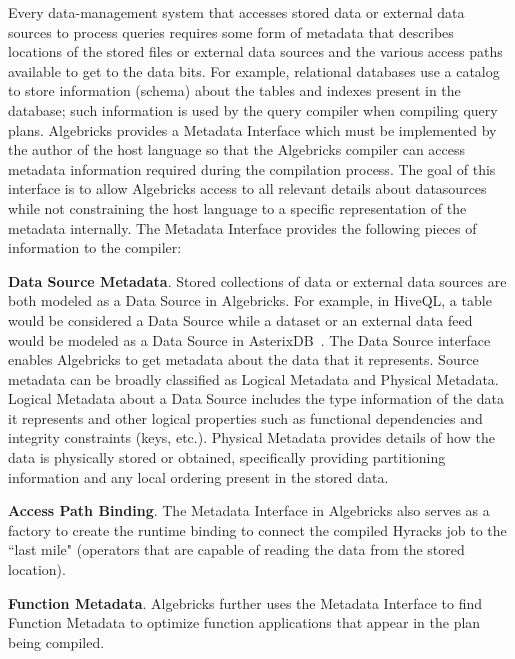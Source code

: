 Every data-management system that accesses stored data or external data sources to process queries requires some form of metadata that describes locations of the stored files or external data sources and the various access paths available to get to the data bits. 
For example, relational databases use a catalog to store information (schema) about
the tables and indexes present in the database; such information is used by the query compiler when compiling query plans. 
Algebricks provides a Metadata Interface which must be implemented by the author of the host language so that the Algebricks compiler can access metadata information required during the compilation process. 
The goal of this interface is to allow Algebricks access to all relevant details about datasources while not constraining the host language to a specific representation of the metadata internally.
%
The Metadata Interface provides the following pieces of information to the compiler:

\begin{asparaitem}
\item \textbf{Data Source Metadata}. Stored collections of data or external data sources are both modeled as a Data Source in Algebricks. 
For example, in HiveQL, a table would be considered a Data Source while a dataset or an external data feed would be modeled as a Data Source in AsterixDB~\cite{ASTERIX,DBLP:conf/edbt/GroverC15}.
The Data Source interface enables Algebricks to get metadata about the data that it represents. 
Source metadata can be broadly classified as Logical Metadata and Physical Metadata. 
Logical Metadata about a Data Source includes the type information of the data it represents and other logical properties such as functional dependencies and integrity constraints (keys, etc.). 
Physical Metadata provides details of how the data is physically stored or obtained, specifically providing partitioning information and any local ordering present in the stored data.

\item \textbf{Access Path Binding}. The Metadata Interface in Algebricks also serves as a factory to create the runtime binding to connect the compiled Hyracks job to the ``last mile" (operators that are capable of reading the data from the stored location).

\item \textbf{Function Metadata}. Algebricks further uses the Metadata Interface to find Function Metadata to optimize function applications that appear in the plan being compiled.
\end{asparaitem}

